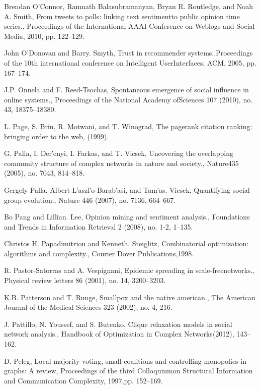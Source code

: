 \begin{thebibliography}{999}
 Brendan O’Connor, Ramnath Balasubramanyan, Bryan R. Routledge, and Noah A. Smith, From tweets to polls: linking text sentimentto public opinion time series., Proceedings of the International AAAI Conference on Weblogs and Social Media, 2010, pp. 122–129.

 John O’Donovan and Barry. Smyth, Trust in recommender systems.,Proceedings of the 10th international conference on Intelligent UserInterfaces, ACM, 2005, pp. 167–174.

 J.P. Onnela and F. Reed-Tsochas, Spontaneous emergence of social influence in online systems., Proceedings of the National Academy ofSciences 107 (2010), no. 43, 18375–18380.

 L. Page, S. Brin, R. Motwani, and T. Winograd, The pagerank citation ranking: bringing order to the web, (1999).

 G. Palla, I. Der′enyi, I. Farkas, and T. Vicsek, Uncovering the overlapping community structure of complex networks in nature and society., Nature435 (2005), no. 7043, 814–818.

 Gergely Palla, Albert-L′aszl′o Barab′asi, and Tam′as. Vicsek, Quantifying social group evolution., Nature 446 (2007), no. 7136, 664–667.

 Bo Pang and Lillian. Lee, Opinion mining and sentiment analysis., Foundations and Trends in Information Retrieval 2 (2008), no. 1-2, 1–135.

 Christos H. Papadimitriou and Kenneth. Steiglitz, Combinatorial optimization: algorithms and complexity., Courier Dover Publications,1998.

 R. Pastor-Satorras and A. Vespignani, Epidemic spreading in scale-freenetworks., Physical review letters 86 (2001), no. 14, 3200–3203.

 K.B. Patterson and T. Runge, Smallpox and the native american., The American Journal of the Medical Sciences 323 (2002), no. 4, 216.

 J. Pattillo, N. Youssef, and S. Butenko, Clique relaxation models in social network analysis., Handbook of Optimization in Complex Networks(2012), 143–162.

 D. Peleg, Local majority voting, small coalitions and controlling monopolies in graphs: A review, Proceedings of the third Colloquiumon Structural Information and Communication Complexity, 1997,pp. 152–169.


\end{thebibliography}
